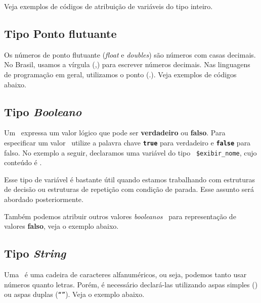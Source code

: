 Veja exemplos de códigos de atribuição de variáveis do tipo inteiro.



\subsection{Tipo Ponto flutuante}
\label{tipo-ponto-flutuante}
Os números de ponto flutuante (\textit{float} e \textit{doubles}) são números com
casas decimais. No Brasil, usamos a vírgula (,) para escrever números decimais.
Nas linguagens de programação em geral, utilizamos o ponto (.). Veja exemplos de códigos
abaixo.



\subsection{Tipo \textit{Booleano}}
\label{tipo-booleano}

Um \booleano~expressa um valor lógico que pode ser \textbf{verdadeiro} ou 
\textbf{falso}. Para especificar um valor \booleano~utilize a palavra chave
\texttt{\textbf{true}} para verdadeiro e \texttt{\textbf{false}} para falso. No exemplo 
a seguir, declaramos uma variável do tipo \booleano~\texttt{\$exibir\_nome}, cujo conteúdo
é \textbf{\true}.

Esse tipo de variável é bastante útil quando estamos trabalhando com estruturas de decisão
ou estruturas de repetição com condição de parada. Esse assunto será abordado posteriormente.



Também podemos atribuir outros valores \textit{booleanos}~ para representação de valores 
\textbf{falso}, veja o exemplo abaixo.



\subsection{Tipo \textit{String}}
\label{tipo-string}

Uma \tipostring~é uma cadeira de caracteres alfanuméricos, ou seja, podemos tanto usar números
quanto letras. Porém, é necessário declará-las utilizando aspas simples 
(\texttt{\textquotesingle \textquotesingle}) ou aspas duplas (\texttt{``''}). Veja o exemplo abaixo.


